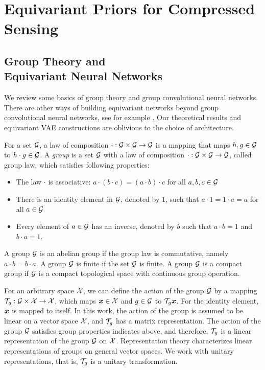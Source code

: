 \newpage

\chapter{Equivariant Priors for Compressed Sensing} 
\newpage
\section[Group Theory and Equivariant Neural Networks]{Group Theory and \\ Equivariant Neural Networks}

We review some basics of group theory and group convolutional neural networks. There are other ways of building equivariant networks beyond group convolutional neural networks, see for example \cite{e2cnn,cohen_steerable_2016,Kondor2018-GENERAL,cesa2022a}. Our theoretical results and equivariant VAE constructions are oblivious to the choice of architecture. 

For a set ${\mathcal{G}}$, a law of composition $\cdot : {\mathcal{G}} \times {\mathcal{G}} \to {\mathcal{G}}$ is a mapping that maps $h, g\in{\mathcal{G}}$ to $h \cdot g\in{\mathcal{G}}$. A \textit{group} is a set ${\mathcal{G}}$ with a  law of composition $\cdot : {\mathcal{G}} \times {\mathcal{G}} \to {\mathcal{G}}$, called {group law},  which satisfies following properties:
    \begin{itemize}
        \item The law $\cdot$ is associative: $a \cdot (b \cdot c) = (a \cdot b) \cdot c$ for all $ a, b, c \in {\mathcal{G}}$
        \item There is an identity element in ${\mathcal{G}}$, denoted by $1$, such that $a \cdot 1 = 1 \cdot a = a$ for all $a\in{\mathcal{G}}$
        \item Every element of $a\in{\mathcal{G}}$ has an inverse, denoted by $b$ such that $a\cdot b=1$ and $b\cdot a=1$.
    \end{itemize}

A group ${\mathcal{G}}$ is an abelian group if the group law is {commutative}, namely $a\cdot b =b \cdot a$. 
A group ${\mathcal{G}}$ is {finite} if the set ${\mathcal{G}}$ is finite. A group ${\mathcal{G}}$ is a {compact} group if ${\mathcal{G}}$ is a compact topological space with continuous group operation.

For an arbitrary space ${\mathcal{X}}$, we can define the action of the group ${\mathcal{G}}$ by a mapping ${\mathcal{T}}_g: {\mathcal{G}} \times {\mathcal{X}} \to {\mathcal{X}}$, which maps ${\bm{x}}\in{\mathcal{X}}$ and $g\in{\mathcal{G}}$ to ${\mathcal{T}}_g{\bm{x}}$. For the identity element, ${\bm{x}}$ is mapped to itself. In this work, the action of the group is assumed to be linear on a vector space ${\mathcal{X}}$, and ${\mathcal{T}}_g$ has a matrix representation. The action of the group ${\mathcal{G}}$ satisfies group properties indicates above, and therefore, ${\mathcal{T}}_g$ is a linear representation of the group ${\mathcal{G}}$ on ${\mathcal{X}}$. Representation theory characterizes linear representations of groups on general vector spaces. We work with unitary representations, that is,  ${\mathcal{T}}_g$ is a unitary transformation.


